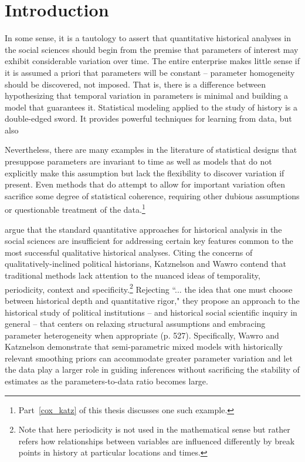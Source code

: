 \chapter{Introduction}
\label{introduction}

%


In some sense, it is a tautology to assert that quantitative historical analyses in the 
social sciences should begin from the premise that parameters of interest may exhibit 
considerable variation over time. The entire enterprise makes little sense if it is assumed 
a priori that parameters will be constant -- parameter homogeneity should be discovered, 
not imposed. That is, there is a difference between hypothesizing that temporal variation 
in parameters is minimal and building a model that guarantees it. Statistical modeling 
applied to the study of history is a double-edged sword. It provides powerful 
techniques for learning from data, but also 

Nevertheless, there are many examples in the literature of statistical designs 
that presuppose parameters are invariant to time as well as models that do not explicitly 
make this assumption but lack the flexibility to discover variation if present.  Even methods that 
do attempt to allow for important variation often sacrifice some degree of statistical 
coherence, requiring other dubious assumptions or questionable treatment of the data.\footnote{
Part~\ref{cox_katz} of this thesis discusses one such example.}

 argue that the standard quantitative approaches for historical 
analysis in the social sciences are insufficient for addressing certain key features common to 
the most successful qualitative historical analyses. Citing the concerns of qualitatively-inclined 
political historians, Katznelson and Wawro contend that traditional methods lack attention to 
the nuanced ideas of temporality, periodicity, context and specificity.\footnote{Note that here 
periodicity is not used in the mathematical sense but rather refers how relationships between 
variables are influenced differently by break points in history at particular locations and times.}  
Rejecting ``... the idea that one must choose between historical depth and quantitative rigor," 
they propose an approach to the historical study of political institutions -- and historical social 
scientific inquiry in general --  that centers on relaxing structural assumptions and embracing 
parameter heterogeneity when appropriate (p. 527). Specifically, Wawro and Katznelson 
demonstrate that semi-parametric mixed models with historically relevant smoothing priors 
can accommodate greater parameter variation and let the data play a larger role in guiding 
inferences without sacrificing the stability of estimates as the parameters-to-data ratio becomes 
large.  

